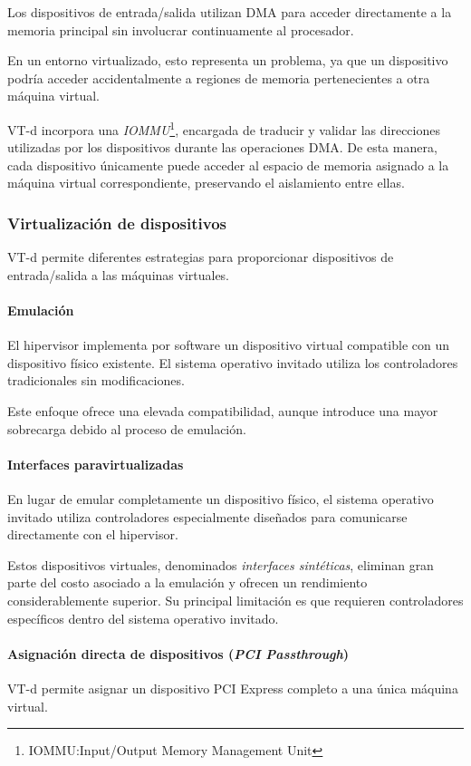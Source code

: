 Los dispositivos de entrada/salida utilizan DMA para acceder directamente a la memoria principal sin involucrar continuamente al procesador.

En un entorno virtualizado, esto representa un problema, ya que un dispositivo podría acceder accidentalmente a regiones de memoria pertenecientes a otra máquina virtual.

VT-d incorpora una \textit{IOMMU}\footnote{IOMMU:Input/Output Memory Management Unit}, encargada de traducir y validar las direcciones utilizadas por los dispositivos durante las operaciones DMA. De esta manera, cada dispositivo únicamente puede acceder al espacio de memoria asignado a la máquina virtual correspondiente, preservando el aislamiento entre ellas.

\subsubsection{Virtualización de dispositivos}

VT-d permite diferentes estrategias para proporcionar dispositivos de entrada/salida a las máquinas virtuales.

\paragraph{Emulación}
El hipervisor implementa por software un dispositivo virtual compatible con un dispositivo físico existente. El sistema operativo invitado utiliza los controladores tradicionales sin modificaciones.

Este enfoque ofrece una elevada compatibilidad, aunque introduce una mayor sobrecarga debido al proceso de emulación.

\paragraph{Interfaces paravirtualizadas}
En lugar de emular completamente un dispositivo físico, el sistema operativo invitado utiliza controladores especialmente diseñados para comunicarse directamente con el hipervisor.

Estos dispositivos virtuales, denominados \textit{interfaces sintéticas}, eliminan gran parte del costo asociado a la emulación y ofrecen un rendimiento considerablemente superior. Su principal limitación es que requieren controladores específicos dentro del sistema operativo invitado.

\paragraph{Asignación directa de dispositivos (\textit{PCI Passthrough})}
VT-d permite asignar un dispositivo PCI Express completo a una única máquina virtual.


